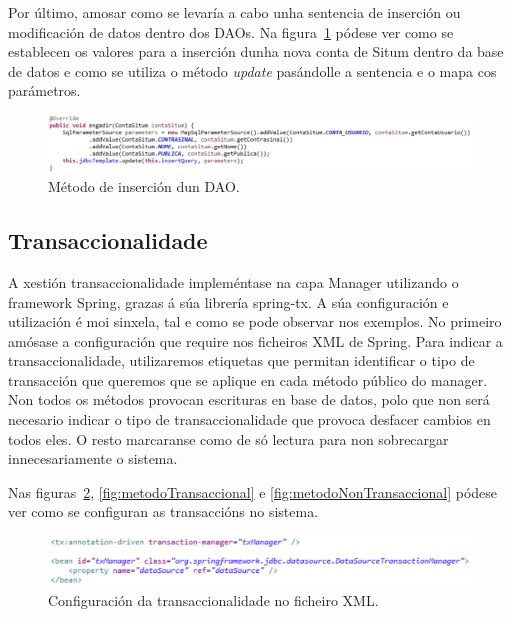 Por último, amosar como se levaría a cabo unha sentencia de inserción ou modificación de datos dentro dos DAOs. Na figura~\ref{fig:daoInsert} pódese ver como se establecen os valores para a inserción dunha nova conta de Situm dentro da base de datos e como se utiliza o método \emph{update} pasándolle a sentencia e o mapa cos parámetros.

\begin{figure}[tbh] 
	\begin{center}
		\includegraphics[width=1\textwidth]{figures/codigo/daoInsert}
		\caption{Método de inserción dun DAO.}
		\label{fig:daoInsert}
	\end{center}
\end{figure}


\subsection{Transaccionalidade}
A xestión transaccionalidade impleméntase na capa Manager utilizando o framework Spring, grazas á súa librería spring-tx. A súa configuración e utilización é moi sinxela, tal e como se pode observar nos exemplos. No primeiro amósase a configuración que require nos ficheiros XML de Spring. Para indicar a transaccionalidade, utilizaremos etiquetas que permitan identificar o tipo de transacción que queremos que se aplique en cada método público do manager. Non todos os métodos provocan escrituras en base de datos, polo que non será necesario indicar o tipo de transaccionalidade que provoca desfacer cambios en todos eles. O resto marcaranse como de só lectura para non sobrecargar innecesariamente o sistema.

Nas figuras~\ref{fig:transaccionConfiguracion}, \ref{fig:metodoTransaccional} e \ref{fig:metodoNonTransaccional} pódese ver como se configuran as transaccións no sistema.


\begin{figure}[H] 
	\begin{center}
		\includegraphics[width=1\textwidth]{figures/codigo/transaccionConfiguracion}
		\caption{Configuración da transaccionalidade no ficheiro XML.}
		\label{fig:transaccionConfiguracion}
	\end{center}
\end{figure}


